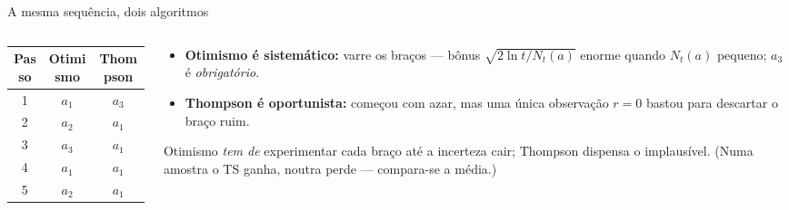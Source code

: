 \documentclass[aspectratio=169, 11pt]{beamer}
\begin{document}
\begin{frame}{A mesma sequência, dois algoritmos}
  \begin{columns}[T]
    \begin{column}{0.42\textwidth}
      \begin{center}\small
      \begin{tabular}{@{}ccc@{}}
        \toprule
        \textbf{Passo} & \textbf{Otimismo} & \textbf{Thompson} \\
        \midrule
        1 & $a_1$ & $a_3$ \\
        2 & $a_2$ & $a_1$ \\
        3 & $a_3$ & $a_1$ \\
        4 & $a_1$ & $a_1$ \\
        5 & $a_2$ & $a_1$ \\
        \bottomrule
      \end{tabular}
      \end{center}
    \end{column}
    \begin{column}{0.55\textwidth}
      \begin{itemize}
        \item \textbf{Otimismo é sistemático:} varre os braços — bônus
              $\sqrt{2\ln t / N_t(a)}$ enorme quando $N_t(a)$ pequeno;
              $a_3$ é \emph{obrigatório}.
        \item \textbf{Thompson é oportunista:} começou com azar, mas uma
              única observação $r=0$ bastou para descartar o braço ruim.
      \end{itemize}

      \begin{ideiabox}
        Otimismo \emph{tem de} experimentar cada braço até a incerteza
        cair; Thompson dispensa o implausível. (Numa amostra o TS ganha,
        noutra perde — compara-se a \alert{média}.)
      \end{ideiabox}
    \end{column}
  \end{columns}
\end{frame}
\end{document}

